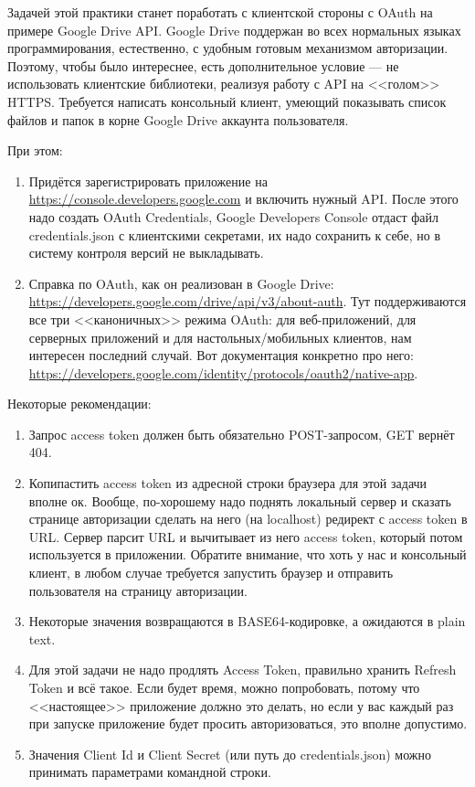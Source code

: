 \documentclass{../../text-style}
\begin{document}
\maketitle
\thispagestyle{empty}

Задачей этой практики станет поработать с клиентской стороны с OAuth на примере Google Drive API. Google Drive поддержан во всех нормальных языках программирования, естественно, с удобным готовым механизмом авторизации. Поэтому, чтобы было интереснее, есть дополнительное условие --- не использовать клиентские библиотеки, реализуя работу с API на <<голом>> HTTPS. Требуется написать консольный клиент, умеющий показывать список файлов и папок в корне Google Drive аккаунта пользователя.

При этом: 
\begin{enumerate}
    \item Придётся зарегистрировать приложение на \url{https://console.developers.google.com} и включить нужный API. После этого надо создать OAuth Credentials, Google Developers Console отдаст файл credentials.json с клиентскими секретами, их надо сохранить к себе, но в систему контроля версий не выкладывать.
    \item Справка по OAuth, как он реализован в Google Drive: \url{https://developers.google.com/drive/api/v3/about-auth}. Тут поддерживаются все три <<каноничных>> режима OAuth: для веб-приложений, для серверных приложений и для настольных/мобильных клиентов, нам интересен последний случай. Вот документация конкретно про него: \url{https://developers.google.com/identity/protocols/oauth2/native-app}.
\end{enumerate}

Некоторые рекомендации:
\begin{enumerate}
    \item Запрос access token должен быть обязательно POST-запросом, GET вернёт 404. 
    \item Копипастить access token из адресной строки браузера для этой задачи вполне ок. Вообще, по-хорошему надо поднять локальный сервер и сказать странице авторизации сделать на него (на localhost) редирект с access token в URL. Сервер парсит URL и вычитывает из него access token, который потом используется в приложении. Обратите внимание, что хоть у нас и консольный клиент, в любом случае требуется запустить браузер и отправить пользователя на страницу авторизации.
    \item Некоторые значения возвращаются в BASE64-кодировке, а ожидаются в plain text.
    \item Для этой задачи не надо продлять Access Token, правильно хранить Refresh Token и всё такое. Если будет время, можно попробовать, потому что <<настоящее>> приложение должно это делать, но если у вас каждый раз при запуске приложение будет просить авторизоваться, это вполне допустимо.
    \item Значения Client Id и Client Secret (или путь до credentials.json) можно принимать параметрами командной строки.
\end{enumerate}
\end{document}
